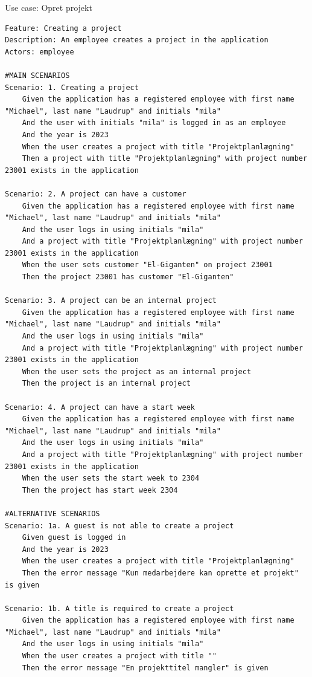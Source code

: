 \begin{listing}[H]
    \centering
    \caption{Use case: Opret projekt}\label{lst:usecase_create_project}
    \begin{verbatim}  
Feature: Creating a project
Description: An employee creates a project in the application
Actors: employee

#MAIN SCENARIOS
Scenario: 1. Creating a project
    Given the application has a registered employee with first name "Michael", last name "Laudrup" and initials "mila"
    And the user with initials "mila" is logged in as an employee
    And the year is 2023
    When the user creates a project with title "Projektplanlægning" 
    Then a project with title "Projektplanlægning" with project number 23001 exists in the application

Scenario: 2. A project can have a customer
    Given the application has a registered employee with first name "Michael", last name "Laudrup" and initials "mila"
    And the user logs in using initials "mila"
    And a project with title "Projektplanlægning" with project number 23001 exists in the application
    When the user sets customer "El-Giganten" on project 23001
    Then the project 23001 has customer "El-Giganten"

Scenario: 3. A project can be an internal project
    Given the application has a registered employee with first name "Michael", last name "Laudrup" and initials "mila"
    And the user logs in using initials "mila"
    And a project with title "Projektplanlægning" with project number 23001 exists in the application
    When the user sets the project as an internal project
    Then the project is an internal project

Scenario: 4. A project can have a start week
    Given the application has a registered employee with first name "Michael", last name "Laudrup" and initials "mila"
    And the user logs in using initials "mila"
    And a project with title "Projektplanlægning" with project number 23001 exists in the application
    When the user sets the start week to 2304
    Then the project has start week 2304

#ALTERNATIVE SCENARIOS
Scenario: 1a. A guest is not able to create a project
    Given guest is logged in
    And the year is 2023
    When the user creates a project with title "Projektplanlægning" 
    Then the error message "Kun medarbejdere kan oprette et projekt" is given

Scenario: 1b. A title is required to create a project
    Given the application has a registered employee with first name "Michael", last name "Laudrup" and initials "mila"
    And the user logs in using initials "mila"
    When the user creates a project with title ""
    Then the error message "En projekttitel mangler" is given

    \end{verbatim}
\end{listing}
